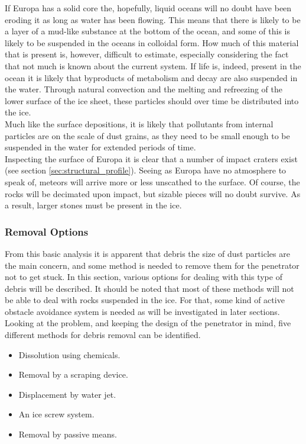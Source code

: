 \noindent
If Europa has a solid core the, hopefully, liquid oceans will no doubt have been eroding it as long as water has been flowing. This means that there is likely to be a layer of a mud-like substance at the bottom of the ocean, and some of this is likely to be suspended in the oceans in colloidal form. How much of this material that is present is, however, difficult to estimate, especially considering the fact that not much is known about the current system. If life is, indeed, present in the ocean it is likely that byproducts of metabolism and decay are also suspended in the water. Through natural convection and the melting and refreezing of the lower surface of the ice sheet, these particles should over time be distributed into the ice. \\
Much like the surface depositions, it is likely that pollutants from internal particles are on the scale of dust grains, as they need to be small enough to be suspended in the water for extended periods of time.\\

\noindent
Inspecting the surface of Europa it is clear that a number of impact craters exist (see section \ref{sec:structural_profile}). Seeing as Europa have no atmosphere to speak of, meteors will arrive more or less unscathed to the surface. Of course, the rocks will be decimated upon impact, but sizable pieces will no doubt survive. As a result, larger stones must be present in the ice.  \\

\subsubsection{Removal Options}
From this basic analysis it is apparent that debris the size of dust particles are the main concern, and some method is needed to remove them for the penetrator not to get stuck. In this section, various options for dealing with this type of debris will be described. It should be noted that most of these methods will not be able to deal with rocks suspended in the ice. For that, some kind of active obstacle avoidance system is needed as will be investigated in later sections.\\

\noindent
Looking at the problem, and keeping the design of the penetrator in mind, five different methods for debris removal can be identified.
\begin{itemize}
	\item Dissolution using chemicals.
	\item Removal by a scraping device.
	\item Displacement by water jet.
	\item An ice screw system.
	\item Removal by passive means.
\end{itemize}


